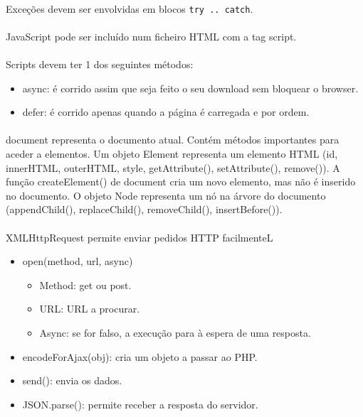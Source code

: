 \documentclass[../resumosLTW.tex]{subfiles}
\begin{document}
\paragraph{}

Exceções devem ser envolvidas em blocos \lstinline{try .. catch}.

\paragraph{}

JavaScript pode ser incluído num ficheiro HTML com a tag script.

\paragraph{}

Scripts devem ter 1 dos seguintes métodos:
\begin{itemize}
    \item async: é corrido assim que seja feito o seu download sem bloquear o browser.
    \item defer: é corrido apenas quando a página é carregada e por ordem.
\end{itemize}

\paragraph{}

document representa o documento atual.
Contém métodos importantes para aceder a elementos.
Um objeto Element representa um elemento HTML (id, innerHTML, outerHTML, style, getAttribute(), setAttribute(), remove()).
A função createElement() de document cria um novo elemento, mas não é inserido no documento.
O objeto Node representa um nó na árvore do documento (appendChild(), replaceChild(), removeChild(), insertBefore()).

\paragraph{}

XMLHttpRequest permite enviar pedidos HTTP facilmenteL
\begin{itemize}
    \item open(method, url, async)
    \begin{itemize}
        \item Method: get ou post.
        \item URL: URL a procurar.
        \item Async: se for falso, a execução para à espera de uma resposta.
    \end{itemize}
    \item encodeForAjax(obj): cria um objeto a passar ao PHP.
    \item send(): envia os dados.
    \item JSON.parse(): permite receber a resposta do servidor.
\end{itemize}
\end{document}
